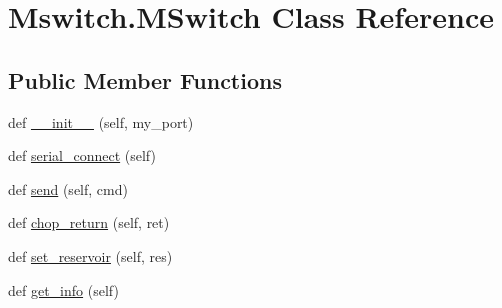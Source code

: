 \hypertarget{class_mswitch_1_1_m_switch}{}\section{Mswitch.\+M\+Switch Class Reference}
\label{class_mswitch_1_1_m_switch}
\subsection*{Public Member Functions}
\begin{DoxyCompactItemize}
\item 
def \mbox{\hyperlink{class_mswitch_1_1_m_switch_a0fb0dfae18d749480c2f1951f8d33e7d}{\+\_\+\+\_\+init\+\_\+\+\_\+}} (self, my\+\_\+port)
\item 
def \mbox{\hyperlink{class_mswitch_1_1_m_switch_a1ea0e8470eaf51e2971ebbc55632b394}{serial\+\_\+connect}} (self)
\item 
def \mbox{\hyperlink{class_mswitch_1_1_m_switch_a5ed9dff363e8dcc66e12d6d9583ed491}{send}} (self, cmd)
\item 
def \mbox{\hyperlink{class_mswitch_1_1_m_switch_a7f9619b4aa0ad0e06121c6c52b13dca4}{chop\+\_\+return}} (self, ret)
\item 
def \mbox{\hyperlink{class_mswitch_1_1_m_switch_abc4ef313e6319d0d71197ffbed7be4c0}{set\+\_\+reservoir}} (self, res)
\item 
def \mbox{\hyperlink{class_mswitch_1_1_m_switch_a340f3cb2d10d8fc3681c6f215201d331}{get\+\_\+info}} (self)
\end{DoxyCompactItemize}
